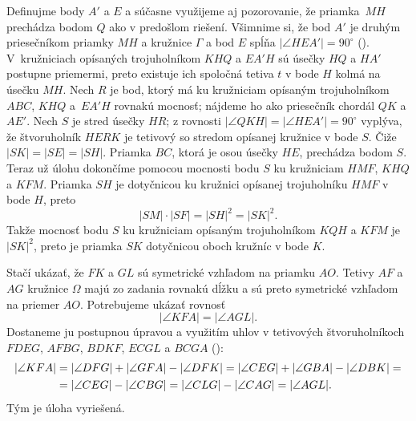 {\ineriesenie
Definujme body $A'$ a $E$ a súčasne využijeme aj pozorovanie, že priamka~$MH$ prechádza bodom $Q$ ako v predošlom riešení. Všimnime si, že bod $A'$ je druhým priesečníkom priamky $MH$ a kružnice $\Gamma$ a bod $E$ spĺňa $|\angle HEA'|=90^\circ$ (\obr).
% 
V~kružniciach opísaných trojuholníkom $KHQ$ a $EA'H$ sú úsečky $HQ$ a $HA'$ postupne priemermi, preto existuje ich spoločná tetiva $t$ v bode $H$ kolmá na úsečku $MH$. Nech $R$ je bod, ktorý má ku kružniciam opísaným trojuholníkom $ABC$, $KHQ$ a~$EA'H$ rovnakú mocnosť; nájdeme ho ako priesečník chordál $QK$ a $AE'$. Nech $S$ je stred úsečky $HR$; z rovnosti $|\angle QKH|=|\angle HEA'|=90^\circ$ vyplýva, že štvoruholník $HERK$ je tetivový so stredom opísanej kružnice v bode $S$. Čiže $|SK|=|SE|=|SH|$. Priamka $BC$, ktorá je osou úsečky $HE$, prechádza bodom $S$. Teraz už úlohu dokončíme pomocou mocnosti bodu $S$ ku kružniciam $HMF$, $KHQ$ a $KFM$. Priamka $SH$ je dotyčnicou ku kružnici opísanej trojuholníku $HMF$ v bode $H$, preto
$$
|SM|\cdot|SF|=|SH|^2=|SK|^2.
$$
Takže mocnosť bodu $S$ ku kružniciam opísaným trojuholníkom $KQH$ a $KFM$ je $|SK|^2$, preto je priamka $SK$ dotyčnicou oboch kružníc v bode $K$.
}

{%
Stačí ukázať, že $FK$ a $GL$ sú symetrické vzhľadom na priamku $AO$. Tetivy $AF$ a $AG$ kružnice $\Omega$ majú zo zadania rovnakú dĺžku a sú preto symetrické vzhľadom na priemer $AO$. Potrebujeme ukázať rovnosť
$$
|\angle KFA|=|\angle AGL|.
$$
Dostaneme ju postupnou úpravou a využitím uhlov v tetivových štvoruholníkoch $FDEG$, $AFBG$, $BDKF$, $ECGL$ a $BCGA$ (\obr):
$$
\aligned
|\angle KFA|&=|\angle DFG|+|\angle GFA|-|\angle DFK| =|\angle CEG|+|\angle GBA|-|\angle DBK| =\\
&=|\angle CEG|-|\angle CBG| = |\angle CLG|-|\angle CAG|=|\angle AGL|.
\endaligned
$$
Tým je úloha vyriešená.
%
}

